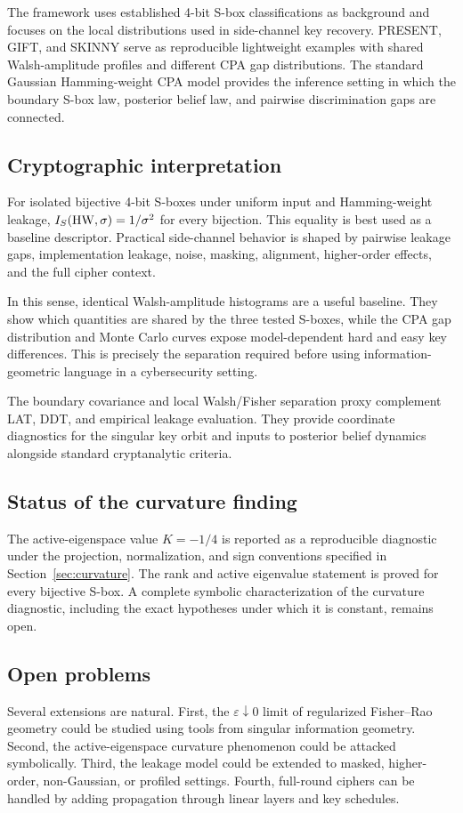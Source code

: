 The framework uses established 4-bit S-box classifications as background and
focuses on the local distributions used in side-channel key recovery.  PRESENT,
GIFT, and SKINNY serve as reproducible lightweight examples with shared
Walsh-amplitude profiles and different CPA gap distributions.  The standard
Gaussian Hamming-weight CPA model provides the inference setting in which the
boundary S-box law, posterior belief law, and pairwise discrimination gaps are
connected.

\subsection{Cryptographic interpretation}

For isolated bijective 4-bit S-boxes under uniform input and Hamming-weight
leakage, $I_S(\mathrm{HW},\sigma)=1/\sigma^2$ for every bijection.  This equality is
best used as a baseline descriptor.  Practical side-channel behavior is shaped
by pairwise leakage gaps, implementation leakage, noise, masking, alignment,
higher-order effects, and the full cipher context.

In this sense, identical Walsh-amplitude histograms are a useful baseline.
They show which quantities are shared by the three tested S-boxes, while the
CPA gap distribution and Monte Carlo curves expose model-dependent hard and
easy key differences.  This is precisely the separation required before using
information-geometric language in a cybersecurity setting.

The boundary covariance and local Walsh/Fisher separation proxy complement LAT,
DDT, and empirical leakage evaluation.  They provide coordinate diagnostics
for the singular key orbit and inputs to posterior belief dynamics alongside
standard cryptanalytic criteria.

\subsection{Status of the curvature finding}

The active-eigenspace value \(K=-1/4\) is reported as a reproducible diagnostic
under the projection, normalization, and sign conventions specified in
Section~\ref{sec:curvature}.  The rank and active eigenvalue statement is
proved for every bijective S-box.  A complete symbolic characterization of the
curvature diagnostic, including the exact hypotheses under which it is
constant, remains open.

\subsection{Open problems}\label{subsec:extensions}

Several extensions are natural.  First, the $\varepsilon\downarrow0$ limit of
regularized Fisher--Rao geometry could be studied using tools from singular
information geometry.  Second, the active-eigenspace curvature phenomenon
could be attacked symbolically.  Third, the leakage model could be extended to
masked, higher-order, non-Gaussian, or profiled settings.  Fourth, full-round
ciphers can be handled by adding propagation through linear layers and key
schedules.

